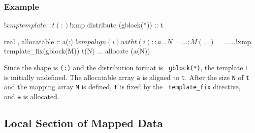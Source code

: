 \subsubsection*{Example}

\begin{Fexample}
!$xmp template :: t(:)
!$xmp distribute (gblock(*)) :: t

      real , allocatable :: a(:)
!$xmp align (i) with t(i) :: a
      ...
      N = ...; M(...) = ...
      ...
!$xmp template_fix(gblock(M)) t(N)
      ...
      allocate (a(N))
\end{Fexample}

Since the shape is {\tt (:)} and the distribution format is {\tt
gblock(*)}, 
the template {\tt t} is initially undefined. The allocatable array
{\tt a} is aligned to {\tt t}. After the size {\tt N} of {\tt t} and the
mapping array {\tt M} is defined, {\tt t} is fixed by the {\tt
  template\_fix} directive, and {\tt a} is allocated.


\subsection{Local Section of Mapped Data}